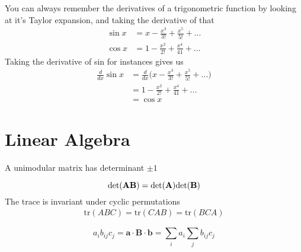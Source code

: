 You can always remember the derivatives of a trigonometric function by looking at it's Taylor expansion, and taking the derivative of that
\begin{align}
	\sin x &= x - \frac{x^3}{3!} + \frac{x^5}{5!} + ...\\
	\cos x &= 1 - \frac{x^2}{2!} + \frac{x^4}{41} + ...
\end{align}
Taking the derivative of sin for instances gives us
\begin{align}
	\frac{d}{dx}\sin x &= \frac{d}{dx}\Big( x - \frac{x^3}{3!} + \frac{x^5}{5!} + ...\Big)\\
	&= 1 - \frac{x^2}{2!} + \frac{x^4}{41} + ...\\
	&= \cos x
\end{align}

\section{Linear Algebra}
A unimodular matrix has determinant $\pm 1$


$$\rm{det}(\bf{AB}) = \rm{det}(\bf{A})\rm{det}(\bf{B})$$
The trace is invariant under cyclic permutations
\begin{align}
	\textrm{tr}(ABC) = \textrm{tr}(CAB) = \textrm{tr}(BCA)
\end{align}

$$a_i b_{ij} c_j = \textbf{a}\cdot\textbf{B}\cdot\textbf{b} = \sum_{i} a_i \sum_{j} b_{ij} c_j$$

